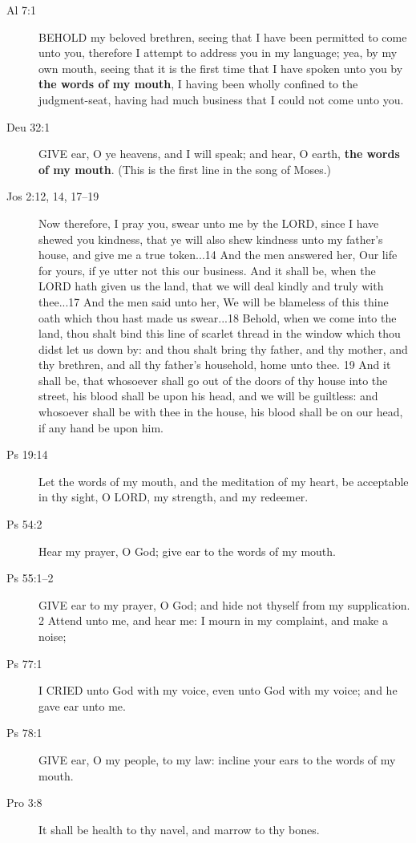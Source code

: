 		\begin{description}
		\item[Al 7:1] BEHOLD my beloved brethren, seeing that I have been permitted to come unto you, therefore I attempt to address you in my language; yea, by my own mouth, seeing that it is the first time that I have spoken unto you by \textbf{the words of my mouth}, I having been wholly confined to the judgment-seat, having had much business that I could not come unto you.
		\item[Deu 32:1] GIVE ear, O ye heavens, and I will speak; and hear, O earth, \textbf{the words of my mouth}. (This is the first line in the song of Moses.)
		\item[Jos 2:12, 14, 17--19] Now therefore, I pray you, swear unto me by the LORD, since I have shewed you kindness, that ye will also shew kindness unto my father's house, and give me a true token...14 And the men answered her, Our life for yours, if ye utter not this our business. And it shall be, when the LORD hath given us the land, that we will deal kindly and truly with thee...17 And the men said unto her, We will be blameless of this thine oath which thou hast made us swear...18 Behold, when we come into the land, thou shalt bind this line of scarlet thread in the window which thou didst let us down by: and thou shalt bring thy father, and thy mother, and thy brethren, and all thy father's household, home unto thee. 19 And it shall be, that whosoever shall go out of the doors of thy house into the street, his blood shall be upon his head, and we will be guiltless: and whosoever shall be with thee in the house, his blood shall be on our head, if any hand be upon him.
		\item[Ps 19:14] Let the words of my mouth, and the meditation of my heart, be acceptable in thy sight, O LORD, my strength, and my redeemer.
		\item[Ps 54:2] Hear my prayer, O God; give ear to the words of my mouth.
		\item[Ps 55:1--2] GIVE ear to my prayer, O God; and hide not thyself from my supplication. 2 Attend unto me, and hear me: I mourn in my complaint, and make a noise;
		\item[Ps 77:1] I CRIED unto God with my voice, even unto God with my voice; and he gave ear unto me.
		\item[Ps 78:1] GIVE ear, O my people, to my law: incline your ears to the words of my mouth.
		\item[Pro 3:8] It shall be health to thy navel, and marrow to thy bones.

\end{description}
